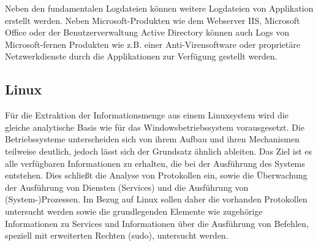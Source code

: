 Neben den fundamentalen Logdateien können weitere Logdateien von Applikation erstellt werden. Neben Microsoft-Produkten wie dem Webserver IIS, Microsoft Office oder der Benutzerverwaltung Active Directory können auch Logs von Microsoft-fernen Produkten wie z.B. einer Anti-Virensoftware oder proprietäre Netzwerkdienste durch die Applikationen zur Verfügung gestellt werden.

\subsection{Linux}
Für die Extraktion der Informationsmenge aus einem Linuxsystem wird die gleiche analytische Basis wie für das Windowsbetriebssystem vorausgesetzt. Die Betriebssysteme unterscheiden sich von ihrem Aufbau und ihren Mechanismen teilweise deutlich, jedoch lässt sich der Grundsatz ähnlich ableiten. Das Ziel ist es alle verfügbaren Informationen zu erhalten, die bei der Ausführung des Systems entstehen. Dies schließt die Analyse von Protokollen ein, sowie die Überwachung der Ausführung von Diensten (Services) und die Ausführung von (System-)Prozessen.
Im Bezug auf Linux sollen daher die vorhanden Protokollen untersucht werden sowie die grundlegenden Elemente wie zugehörige Informationen zu Services und Informationen über die Ausführung von Befehlen, speziell mit erweiterten Rechten (sudo), untersucht werden.

